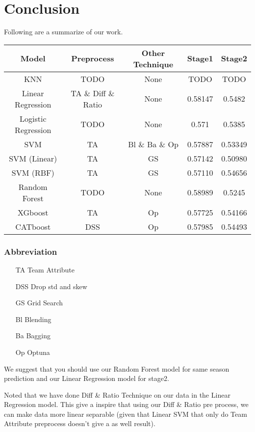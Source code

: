 \section{Conclusion}
Following are a summarize of our work.
\begin{table}[h]
    \centering
    \begin{tabular}{|c|c|c|c|c|}
    \hline
    Model & Preprocess & Other Technique & Stage1 & Stage2 \\ \hline\hline
    KNN   & TODO   & None & TODO & TODO  \\ \hline
    Linear Regression & TA \& Diff \& Ratio & None & 0.58147 & 0.5482 \\ \hline
    Logistic Regression & TODO & None & 0.571 & 0.5385 \\ \hline
    SVM & TA & Bl \& Ba \& Op & 0.57887 & 0.53349 \\ \hline
    SVM (Linear) & TA & GS & 0.57142 & 0.50980 \\ \hline
    SVM (RBF) & TA & GS & 0.57110 & 0.54656 \\ \hline
    Random Forest & TODO & None & 0.58989 & 0.5245 \\ \hline
    XGboost & TA & Op & 0.57725 & 0.54166 \\ \hline
    CATboost & DSS & Op & 0.57985 & 0.54493 \\ \hline
    \end{tabular}
    \label{tab:example_table}
\end{table}
\subsubsection*{Abbreviation}
\begin{itemize}
    \item[TA] Team Attribute
    \item[DSS] Drop std and skew 
    \item[GS] Grid Search
    \item[Bl] Blending
    \item[Ba] Bagging
    \item[Op] Optuna  
\end{itemize}

\par We suggest that you should use our Random Forest model for same season prediction and our Linear Regression model for stage2. 
\par Noted that we have done Diff \& Ratio Technique on our data in the Linear Regression model. This give a inspire that using our Diff \& Ratio pre process, we can make data more linear separable (given that Linear SVM that only do Team Attribute preprocess doesn't give a as well result).
